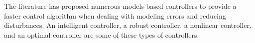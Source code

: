 \documentclass[3p,times]{elsarticle}
\begin{document}

The literature has proposed numerous models-based controllers to provide a faster control algorithm when dealing with modeling errors and reducing disturbances.
An intelligent controller, a robust controller, a nonlinear controller, and an optimal controller are some of these types of controllers.
\end{document}

